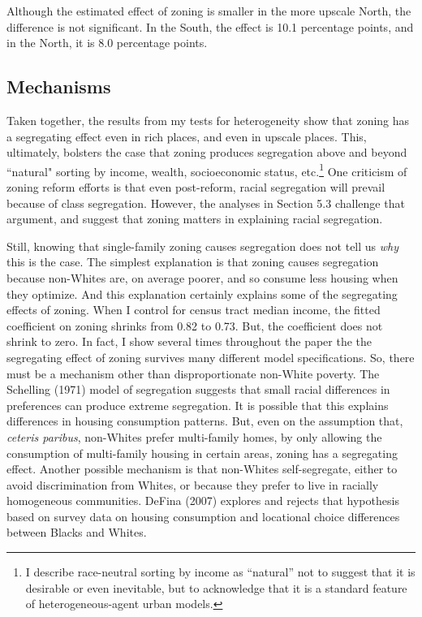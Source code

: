 \documentclass[11pt]{article}
\begin{document}
\noindent Although the estimated effect of zoning is smaller in the more upscale North, the difference is not significant. In the South, the effect is 10.1 percentage points, and in the North, it is 8.0 percentage points.

\subsection{Mechanisms}

Taken together, the results from my tests for heterogeneity show that zoning has a segregating effect even in rich places, and even in  upscale places. This, ultimately, bolsters the case that zoning produces segregation above and beyond  ``natural" sorting by income, wealth, socioeconomic status, etc.\footnote{I describe race-neutral sorting by income as ``natural'' not to suggest that it is desirable or even inevitable, but to acknowledge that it is a standard feature of heterogeneous-agent urban models.} One criticism of zoning reform efforts is that even post-reform, racial segregation will prevail because of class segregation. However, the analyses in Section 5.3 challenge that argument, and suggest that zoning matters in explaining racial segregation. 

Still, knowing that single-family zoning causes segregation does not tell us \textit{why} this is the case. The simplest explanation is that zoning causes segregation because non-Whites are, on average poorer, and so consume less housing when they optimize. And this explanation certainly explains some of the segregating effects of zoning. When I control for census tract median income, the fitted coefficient on zoning shrinks from 0.82 to 0.73. But, the coefficient does not shrink to zero. In fact, I show several times throughout the paper the the segregating effect of zoning survives many different model specifications. So, there must be a mechanism other than disproportionate non-White poverty. The Schelling (1971) model of segregation suggests that small racial differences in preferences can produce extreme segregation. It is possible that this explains differences in housing consumption patterns. But, even on the assumption that, \textit{ceteris paribus}, non-Whites prefer multi-family homes, by only allowing the consumption of multi-family housing in certain areas, zoning has a segregating effect. Another possible mechanism is that non-Whites self-segregate, either to avoid discrimination from Whites, or because they prefer to live in racially homogeneous communities. DeFina (2007) explores and rejects that hypothesis based on survey data on housing consumption and locational choice differences between Blacks and Whites.
\end{document}
